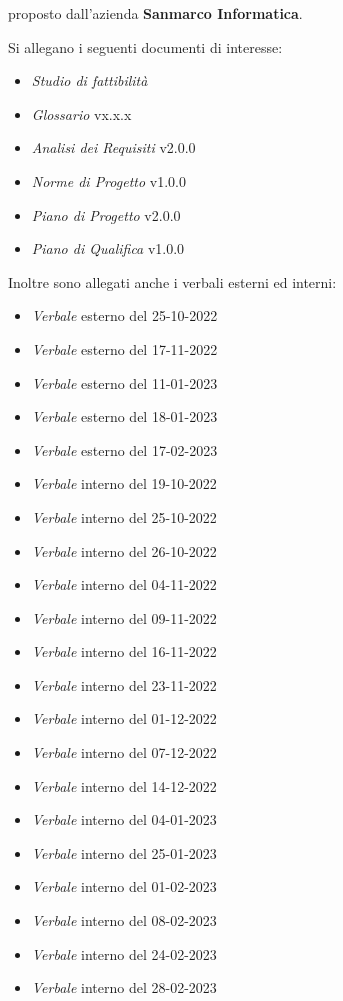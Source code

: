 \documentclass[10pt]{article}
\begin{document}
proposto dall’azienda \textbf{Sanmarco Informatica}.


Si allegano i seguenti documenti di interesse:
\begin{itemize}
  \item \textit{Studio di fattibilità}
  \item \textit{Glossario} vx.x.x
  \item \textit{Analisi dei Requisiti} v2.0.0
  \item \textit{Norme di Progetto} v1.0.0
  \item \textit{Piano di Progetto} v2.0.0
  \item \textit{Piano di Qualifica} v1.0.0
\end{itemize}

Inoltre sono allegati anche i verbali esterni ed interni:

\begin{itemize}
  \item \textit{Verbale} esterno del 25-10-2022
  \item \textit{Verbale} esterno del 17-11-2022
  \item \textit{Verbale} esterno del 11-01-2023
  \item \textit{Verbale} esterno del 18-01-2023
  \item \textit{Verbale} esterno del 17-02-2023
  \item \textit{Verbale} interno del 19-10-2022
  \item \textit{Verbale} interno del 25-10-2022
  \item \textit{Verbale} interno del 26-10-2022
  \item \textit{Verbale} interno del 04-11-2022
  \item \textit{Verbale} interno del 09-11-2022
  \item \textit{Verbale} interno del 16-11-2022
  \item \textit{Verbale} interno del 23-11-2022
  \item \textit{Verbale} interno del 01-12-2022
  \item \textit{Verbale} interno del 07-12-2022
  \item \textit{Verbale} interno del 14-12-2022
  \item \textit{Verbale} interno del 04-01-2023
  \item \textit{Verbale} interno del 25-01-2023
  \item \textit{Verbale} interno del 01-02-2023
  \item \textit{Verbale} interno del 08-02-2023
  \item \textit{Verbale} interno del 24-02-2023
  \item \textit{Verbale} interno del 28-02-2023
\end{itemize}
\end{document}

